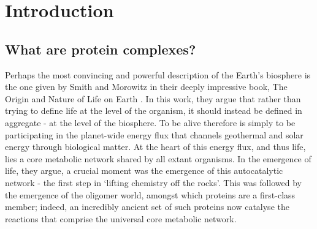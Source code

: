 \documentclass[a4paper,11pt,twoside,openright]{scrbook}
\let\cite\supercite
\begin{document}
\chapter{Introduction}

\section{What are protein complexes?}


Perhaps the most convincing and powerful description of the Earth's biosphere is the one given by Smith and Morowitz in their deeply impressive book, The Origin and Nature of Life on Earth \cite{Smith2016}. In this work, they argue that rather than trying to define life at the level of the organism, it should instead be defined in aggregate - at the level of the biosphere. To be alive therefore is simply to be participating in the planet-wide energy flux that channels geothermal and solar energy through biological matter. At the heart of this energy flux, and thus life, lies a core metabolic network shared by all extant organisms. In the emergence of life, they argue, a crucial moment was the emergence of this autocatalytic network - the first step in `lifting chemistry off the rocks'. This was followed by the emergence of the oligomer world, amongst which proteins are a first-class member; indeed, an incredibly ancient set of such proteins now catalyse the reactions that comprise the universal core metabolic network.

\end{document}
